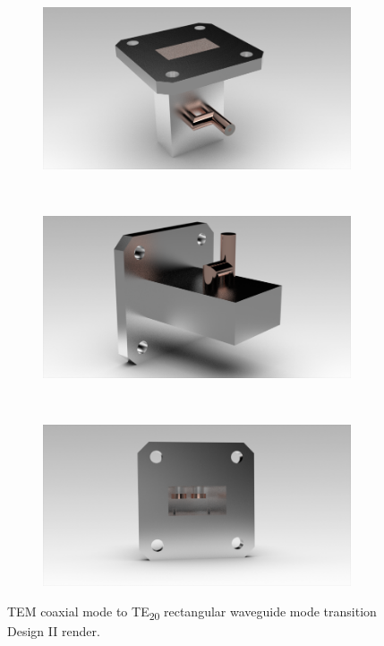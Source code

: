 \documentclass[english,twoside]{article}
\begin{document}
		\newpage
		\begin{figure}[H]
			\centering			
			\begin{subfigure}[b]{0.48\textwidth}
				\includegraphics[width=\textwidth]{renders/coaxToWrTE20_alternative}
			\end{subfigure}
			~
			\begin{subfigure}[b]{0.48\textwidth}
				\includegraphics[width=\textwidth]{renders/coaxToWrTE20_alternative-2}
			\end{subfigure}
			\vspace{10pt}\newline
			~
			\begin{subfigure}[b]{0.48\textwidth}
				\includegraphics[width=\textwidth]{renders/coaxToWrTE20_alternative-3}
			\end{subfigure}		
			\caption{TEM coaxial mode to TE\textsubscript{20} rectangular waveguide mode transition Design II render.}
		\end{figure}	
\end{document}
